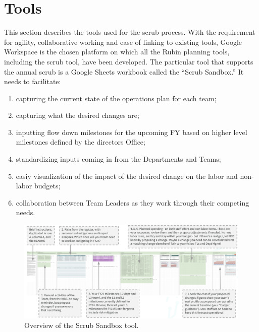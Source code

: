 \section{Tools} \label{sec:tools}

This section describes the tools used for the scrub process. 
With the requirement for agility, collaborative working and ease of linking to existing tools, Google Workspace is the chosen platform on which all the Rubin planning tools, including the scrub tool, have been developed. 
The particular tool that supports the annual scrub is a Google Sheets workbook called the ``Scrub Sandbox.''
It needs to facilitate:
\begin{enumerate}
\item capturing the current state of the operations plan for each team;
\item capturing what the desired changes are;
\item inputting flow down milestones for the upcoming FY based on higher level milestones defined by the directors Office;
\item standardizing inputs coming in from the Departments and Teams;
\item easiy visualization of the impact of the desired change on the labor and non-labor budgets;
\item collaboration between Team Leaders as they work through their competing needs.
\end{enumerate}

\begin{figure}[h!]
\begin{centering}
\includegraphics[width=1.0\textwidth]{Figure3OverviewScrubSandbox}
	\caption{ Overview of the Scrub Sandbox tool.
\label{fig:sandbox}}
\end{centering}
\end{figure}

